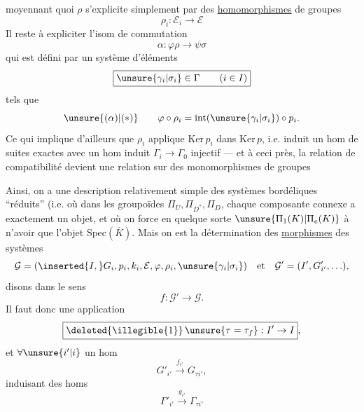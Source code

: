 moyennant quoi $\rho$ s'explicite simplement par des
\uline{homomorphismes} de groupes
\[
\boxed{\rho_i:\mathcal E_i\longrightarrow\mathcal E}
\]
Il reste à expliciter l'isom de commutation
\[
\alpha:\varphi\rho\to\psi\sigma
\]
qui est défini par un système d'éléments
\[
\boxed{\unsure{\gamma_i|\sigma_i}\in\Gamma\qquad(i\in I)}
\]
tels que
\[
\unsure{(\alpha)|(*)}\qquad
\varphi\circ\rho_i=\mathrm{int}(\unsure{\gamma_i|\sigma_i})\circ p_i.
\]
Ce qui implique d'ailleurs que $\rho_i$ 
applique $\mathrm{Ker}\,p_i$ dans $\mathrm{Ker}\,p$, i.e. induit
un hom de suites exactes
avec un hom induit $\Gamma_i\to\Gamma_0$ injectif
--- et à ceci près, la relation de compatibilité
\unsure{$(\alpha)$|$(*)$} devient une relation sur des
monomorphismes de groupes


Ainsi, on a une description relativement simple des systèmes
bordéliques ``réduits'' (i.e. où dans les groupoïdes
$\Pi_U,\Pi_{D^*},\Pi_D$, chaque composante connexe a exactement
un objet, et où  on force en quelque sorte
$\unsure{\Pi_1(K)|\Pi_e(K)}$ à n'avoir que l'objet
$\mathrm{Spec}(\overline K)$.
Mais on est  
 la détermination des \uline{morphismes} des systèmes
\[
\mathcal G=(\inserted{I,}G_i,p_i,k_i,\mathcal E,\varphi,\rho_i,
\unsure{\gamma_i|\sigma_i})
\quad\hbox{et}\quad
\mathcal G'=(I',G'_{i'},\ldots),
\]
 disons dans le sens
\[
f:\mathcal G'\to\mathcal G.
\]
Il faut donc  une application
\[
\boxed{\deleted{\illegible{1}}\,\unsure{\tau=\tau_f}:I'\to I},
\]
et $\forall\unsure{i'|i}$ un hom
\[
\boxed{G'_{i'}\xrightarrow{f_{i'}}G_{\tau i'}},
\]
induisant  des homs
\[
\Gamma'_{i'}\xrightarrow{g_{i'}}\Gamma_{\tau i'}
\]

